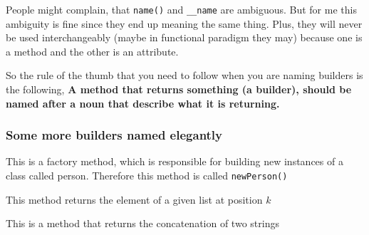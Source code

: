 \begin{Shaded}
\begin{Highlighting}[]
\NormalTok{(} \OperatorTok{+}
\end{Highlighting}
\end{Shaded}

People might complain, that \texttt{name()} and \texttt{\_\_name} are
ambiguous. But for me this ambiguity is fine since they end up meaning
the same thing. Plus, they will never be used interchangeably (maybe in
functional paradigm they may) because one is a method and the other is
an attribute.

So the rule of the thumb that you need to follow when you are naming
builders is the following, \textbf{A method that returns something (a
builder), should be named after a noun that describe what it is
returning.}

\subsubsection{Some more builders named
elegantly}\label{extra-stuff.md__some-more-builders-named-elegantly}

This is a factory method, which is responsible for building new
instances of a class called person. Therefore this method is called
\texttt{newPerson()}

\begin{Shaded}
\begin{Highlighting}[]
\NormalTok{) }\OperatorTok{{-}\textgreater{}}
\end{Highlighting}
\end{Shaded}

This method returns the element of a given list at position \(k\)

\begin{Shaded}
\begin{Highlighting}[]
\NormalTok{:[}\NormalTok{],k:}\NormalTok{) }\OperatorTok{{-}\textgreater{}} \NormalTok{:}
     \NormalTok{[k]}
\end{Highlighting}
\end{Shaded}

This is a method that returns the concatenation of two strings

